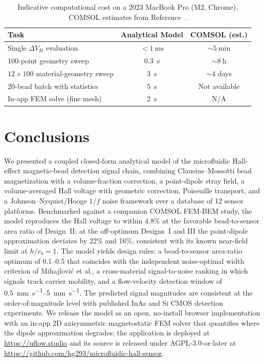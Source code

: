 \documentclass[biosensors,article,submit,pdftex,moreauthors]{Definitions/mdpi}
\begin{document}
\begin{table}[H]
\caption{Indicative computational cost on a 2023 MacBook Pro (M2, Chrome). COMSOL
estimates from Reference~\cite{govindaraju2025}.\label{tab:performance}}
\begin{tabularx}{\textwidth}{Xcc}
\toprule
\textbf{Task} & \textbf{Analytical Model} & \textbf{COMSOL (est.)} \\
\midrule
Single $\Delta V_H$ evaluation        & ${<}\SI{1}{\milli\second}$ & ${\sim}\SI{5}{\minute}$ \\
100-point geometry sweep              & \SI{0.3}{\second}          & ${\sim}\SI{8}{\hour}$ \\
$12 \times 100$ material-geometry sweep & \SI{3}{\second}          & ${\sim}4$ days \\
20-bead batch with statistics         & \SI{5}{\second}            & Not available \\
In-app FEM solve (fine mesh)          & \SI{2}{\second}            & N/A \\
\bottomrule
\end{tabularx}
\end{table}

\section{Conclusions}
\label{sec:conclusions}

We presented a coupled closed-form analytical model of the microfluidic Hall-effect
magnetic-bead detection signal chain, combining Clausius--Mossotti bead magnetization
with a volume-fraction correction, a point-dipole stray field, a volume-averaged Hall
voltage with geometric correction, Poiseuille transport, and a Johnson--Nyquist/Hooge
$1/f$ noise framework over a database of 12 sensor platforms. Benchmarked against a
companion COMSOL FEM-BEM study, the model reproduces the Hall voltage to within 4.8\%
at the favorable bead-to-sensor area ratio of Design~II; at the off-optimum Designs~I
and III the point-dipole approximation deviates by 22\% and 16\%, consistent with its
known near-field limit at $h/r_b = 1$. The model yields design rules: a bead-to-sensor
area-ratio optimum of 0.1--0.5 that coincides with the independent noise-optimal width
criterion of Mihajlovi\'{c} et al., a cross-material signal-to-noise ranking in which
signals track carrier mobility, and a flow-velocity detection window of
\SIrange{0.5}{5}{\milli\meter\per\second}. The predicted signal magnitudes are
consistent at the order-of-magnitude level with published InAs and Si CMOS detection
experiments. We release the model as an open, no-install browser implementation with
an in-app 2D axisymmetric magnetostatic FEM solver that quantifies where the dipole
approximation degrades; the application is deployed at \url{https://uflow.studio} and
its source is released under AGPL-3.0-or-later at
\url{https://github.com/hg293/microfluidic-hall-sensor}.
\end{document}
